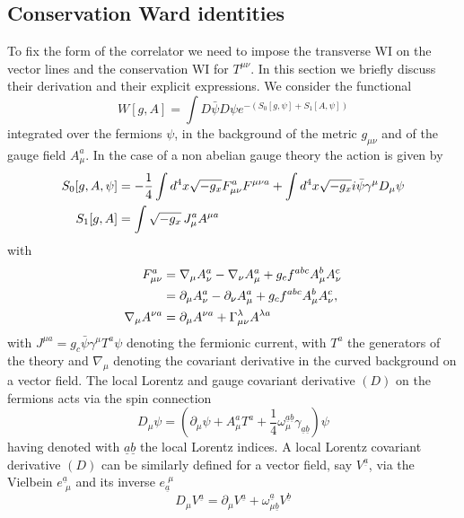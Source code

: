 \documentclass[a4paper,11pt,openright,twoside]{book}
\numberwithin{equation}{section}
\begin{document}
{{{\subsection{Conservation Ward identities} 
To fix the form of the correlator we need to impose the transverse WI on the vector lines and the conservation WI for $T^{\mu\nu}$. 
In this section we briefly discuss their derivation and their explicit expressions.
We consider the functional 
\begin{equation}
	W[g,A] =\int {D\bar\psi}D\psi e^{-(S_0[g,\psi] + S_1[A,\psi ])}
	\label{GF}
\end{equation}
integrated over the fermions $\psi$, in the background of the metric $g_{\mu\nu}$ and of the gauge field $A_\mu^a$. In the case of a non abelian gauge theory the action is given by
\begin{align}
	S_0[g,A,\psi]&=-\frac{1}{4}\int d^4 x \sqrt{-g_x}F_{\mu\nu}^{{a}} F^{\mu\nu a} +\int d^4 x \sqrt{-g_x} i \bar{\psi}\gamma^\mu D_\mu \psi \notag\\
	S_1[g,A]&=\int  \sqrt{-g_x}\,J_\mu^{a} A^{\mu a}
\end{align} 
with
\begin{align}
	F_{\mu\nu}^{a} &=\nabla_\mu A_{\nu}^{a} - \nabla_{\nu} A_{\mu}^{ a} + g_c f^{a  b  c} A_\mu^{ b} A_\nu^c\notag\\ 
	&=\partial_\mu A_{\nu}^{a} - \partial_{\nu} A_{\mu}^{ a} + g_c f^{a  b  c} A_\mu^{ b} A_\nu^c, \notag\\
	\nabla_\mu A^{\nu a} &=\partial_\mu A^{\nu a} +\Gamma_{\mu\nu}^\lambda A^{\lambda a}
\end{align}
with $J^{\mu  a}=g_c\bar{\psi}\gamma^\mu T^{a}\psi$ denoting the fermionic current, with $T^a$ the generators of the theory and $\nabla_\mu$ denoting the covariant derivative in the curved background on a vector field. The local Lorentz and gauge covariant derivative $(D)$ on the fermions acts via the spin connection 
\begin{equation}
	D_\mu \psi=\left( \partial_\mu \psi  + A_\mu^a T^a +\frac{1}{4}\omega_{\mu}^{\underline a \underline b}\gamma_{\underline a \underline b}\right)\psi
\end{equation}
having denoted with $\underline{a}\underline{b}$ the local Lorentz indices.  A local Lorentz covariant derivative $(D)$ can be similarly defined for a vector field, say $V^{\underline a}$, via the Vielbein $e^{\underline a}_{\, \,\mu}$ and its inverse  $e^{\,\,\mu}_{\underline a}$
\begin{equation}
	D_\mu V^{\underline a}= \partial_\mu V^{\underline a} +\omega^{\underline a}_{\mu \underline b} V^{\underline b}

\end{equation}}}}
\end{document}
